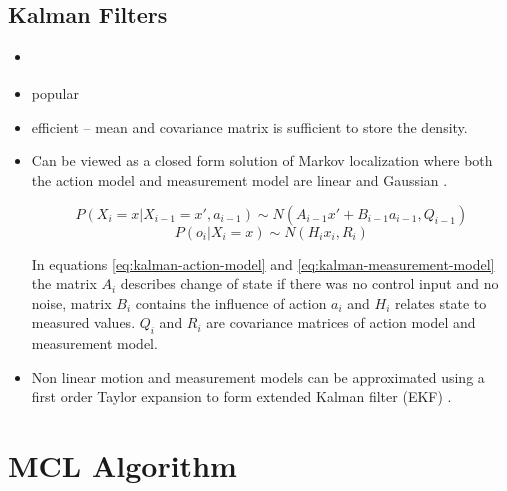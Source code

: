 

\subsection{Kalman Filters}
\label{sec:kalman}

\begin{itemize}
\item \cite{kalman60,welch95}
\item popular
\item efficient -- mean and covariance matrix is sufficient to store the density.
\item Can be viewed as a closed form solution of Markov localization where both the
	action model and measurement model are linear and Gaussian \cite{diard}.

	\begin{equation}
	\label{eq:kalman-action-model}
	P(X_i = x | X_{i-1} = x', a_{i - 1}) \sim N(A_{i - 1}x' + B_{i - 1}a_{i - 1}, Q_{i - 1})
	\end{equation}
	\begin{equation}
	\label{eq:kalman-measurement-model}
	P(o_{i} | X_i = x) \sim N(H_{i}x_{i}, R_i)
	\end{equation}
	
	In equations \eqref{eq:kalman-action-model} and \eqref{eq:kalman-measurement-model}
	the matrix \(A_i\) describes change of state if there was no control input and no noise,
	matrix \(B_i\) contains the influence of action \(a_i\) and \(H_i\) relates state to measured
	values.
	\(Q_i\) and \(R_i\) are covariance matrices of action model and measurement model.

\item Non linear motion and measurement models can be approximated 
	using a first order Taylor expansion to form extended Kalman
	filter (EKF) \cite{welch95}.
\end{itemize}

\section{MCL Algorithm}
\label{sec:mcl-algorithm}

